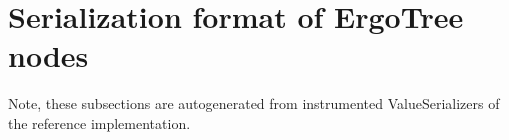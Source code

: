 \section{Serialization format of ErgoTree nodes}
\label{sec:appendix:ergotree_serialization}

Note, these subsections are autogenerated from instrumented ValueSerializers of the
reference implementation.


